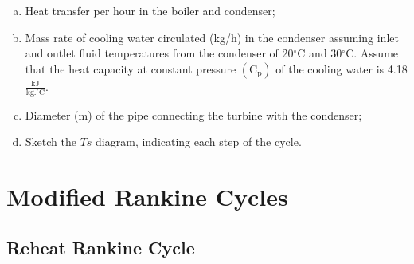 \documentclass[10pt,compress,handout,ignorenonframetext]{beamer}
\begin{document}
\begin{frame}
\begin{enumerate}[(a)]
         \item Heat transfer per hour in the boiler and condenser;
         \item Mass rate of cooling water circulated (kg/h) in the condenser assuming inlet and outlet fluid temperatures from the condenser of 20$^{\circ}$C and 30$^{\circ}$C. Assume that the heat capacity at constant pressure $\left(\text{C}_{\text{p}}\right)$ of the cooling water is 4.18 $\frac{\text{kJ}}{\text{kg.}^{\circ}\text{C}}$.
         \item Diameter (m) of the pipe connecting the turbine with the condenser;
         \item Sketch the $Ts$ diagram, indicating each step of the cycle.
    \end{enumerate}
 \normalsize
\end{frame}


\section{Modified Rankine Cycles}

\subsection{Reheat Rankine Cycle}
\end{document}
